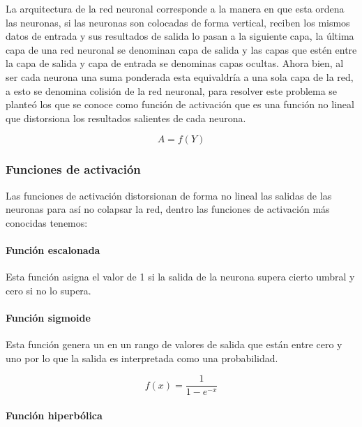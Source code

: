\documentclass[
  12pt,
]{article}
\begin{document}
La arquitectura de la red neuronal corresponde a la manera en que esta
ordena las neuronas, si las neuronas son colocadas de forma vertical,
reciben los mismos datos de entrada y sus resultados de salida lo pasan
a la siguiente capa, la última capa de una red neuronal se denominan
capa de salida y las capas que estén entre la capa de salida y capa de
entrada se denominas capas ocultas. Ahora bien, al ser cada neurona una
suma ponderada esta equivaldría a una sola capa de la red, a esto se
denomina colisión de la red neuronal, para resolver este problema se
planteó los que se conoce como función de activación que es una función
no lineal que distorsiona los resultados salientes de cada neurona.

\[A = f(Y)\]

\hypertarget{funciones-de-activaciuxf3n}{%
\subsubsection{Funciones de
activación}\label{funciones-de-activaciuxf3n}}

Las funciones de activación distorsionan de forma no lineal las salidas
de las neuronas para así no colapsar la red, dentro las funciones de
activación más conocidas tenemos:

\hypertarget{funciuxf3n-escalonada}{%
\paragraph{Función escalonada}\label{funciuxf3n-escalonada}}

Esta función asigna el valor de 1 si la salida de la neurona supera
cierto umbral y cero si no lo supera.

\hypertarget{funciuxf3n-sigmoide}{%
\paragraph{Función sigmoide}\label{funciuxf3n-sigmoide}}

Esta función genera un en un rango de valores de salida que están entre
cero y uno por lo que la salida es interpretada como una probabilidad.

\[ f(x) = \frac{1}{1-e^{-x}}\]

\hypertarget{funciuxf3n-hiperbuxf3lica}{%
\paragraph{Función hiperbólica}\label{funciuxf3n-hiperbuxf3lica}}
\end{document}
